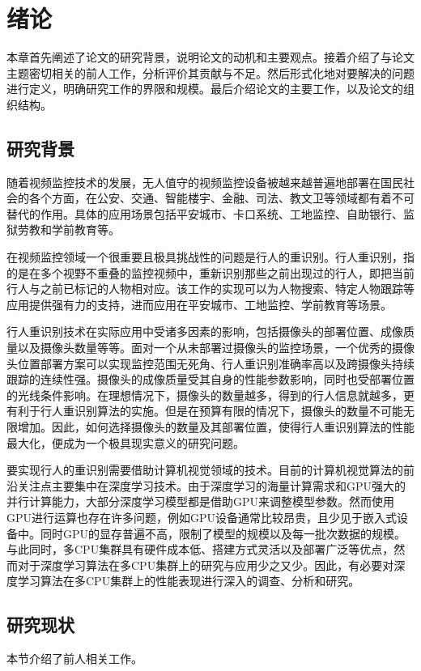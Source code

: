 \chapter{绪论}
本章首先阐述了论文的研究背景，说明论文的动机和主要观点。接着介绍了与论文主题密切相关的前人工作，分析评价其贡献与不足。然后形式化地对要解决的问题进行定义，明确研究工作的界限和规模。最后介绍论文的主要工作，以及论文的组织结构。

\section{研究背景}

随着视频监控技术的发展，无人值守的视频监控设备被越来越普遍地部署在国民社会的各个方面，在公安、交通、智能楼宇、金融、司法、教文卫等领域都有着不可替代的作用。具体的应用场景包括平安城市、卡口系统、工地监控、自助银行、监狱劳教和学前教育等。

在视频监控领域一个很重要且极具挑战性的问题是行人的重识别。行人重识别，指的是在多个视野不重叠的监控视频中，重新识别那些之前出现过的行人，即把当前行人与之前已标记的人物相对应。该工作的实现可以为人物搜索、特定人物跟踪等应用提供强有力的支持，进而应用在平安城市、工地监控、学前教育等场景。

行人重识别技术在实际应用中受诸多因素的影响，包括摄像头的部署位置、成像质量以及摄像头数量等等。面对一个从未部署过摄像头的监控场景，一个优秀的摄像头位置部署方案可以实现监控范围无死角、行人重识别准确率高以及跨摄像头持续跟踪的连续性强。摄像头的成像质量受其自身的性能参数影响，同时也受部署位置的光线条件影响。在理想情况下，摄像头的数量越多，得到的行人信息就越多，更有利于行人重识别算法的实施。但是在预算有限的情况下，摄像头的数量不可能无限增加。因此，如何选择摄像头的数量及其部署位置，使得行人重识别算法的性能最大化，便成为一个极具现实意义的研究问题。

要实现行人的重识别需要借助计算机视觉领域的技术。目前的计算机视觉算法的前沿关注点主要集中在深度学习技术。由于深度学习的海量计算需求和GPU强大的并行计算能力，大部分深度学习模型都是借助GPU来调整模型参数。然而使用GPU进行运算也存在许多问题，例如GPU设备通常比较昂贵，且少见于嵌入式设备中。同时GPU的显存普遍不高，限制了模型的规模以及每一批次数据的规模。与此同时，多CPU集群具有硬件成本低、搭建方式灵活以及部署广泛等优点，然而对于深度学习算法在多CPU集群上的研究与应用少之又少。因此，有必要对深度学习算法在多CPU集群上的性能表现进行深入的调查、分析和研究。

\section{研究现状}
本节介绍了前人相关工作。

